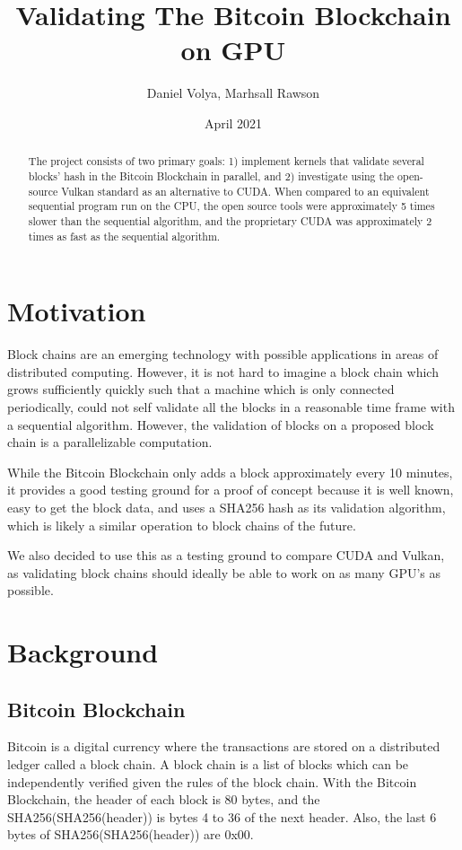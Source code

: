 \documentclass{article}
\title{Validating The Bitcoin Blockchain on GPU}
\author{Daniel Volya, Marhsall Rawson}
\date{April 2021}
\begin{document}
\maketitle

\begin{abstract}
    The project consists of two primary goals: 1) implement kernels that validate several blocks' hash in the Bitcoin Blockchain in parallel, and 2) investigate using the open-source Vulkan standard as an alternative to CUDA. When compared to an equivalent sequential program run on the CPU, the open source tools were approximately 5 times slower than the sequential algorithm, and the proprietary CUDA was  approximately 2 times as fast as the sequential algorithm.
\end{abstract}

\section{Motivation}

Block chains are an emerging technology with possible applications in areas of distributed computing. However, it is not hard to imagine a block chain which grows sufficiently quickly such that a machine which is only connected periodically, could not self validate all the blocks in a reasonable time frame with a sequential algorithm. However, the validation of blocks on a proposed block chain is a parallelizable computation.

While the Bitcoin Blockchain only adds a block approximately every 10 minutes, it provides a good testing ground for a proof of concept because it is well known, easy to get the block data, and uses a SHA256 hash as its validation algorithm, which is likely a similar operation to block chains of the future.

We also decided to use this as a testing ground to compare CUDA and Vulkan, as validating block chains should ideally be able to work on as many GPU's as possible.

\section{Background}
\subsection{Bitcoin Blockchain}

Bitcoin is a digital currency where the transactions are stored on a distributed ledger called a block chain. A block chain is a list of blocks which can be independently verified given the rules of the block chain. With the Bitcoin Blockchain, the header of each block is 80 bytes, and the SHA256(SHA256(header)) is bytes 4 to 36 of the next header. Also, the last 6 bytes of SHA256(SHA256(header)) are 0x00.
\end{document}
